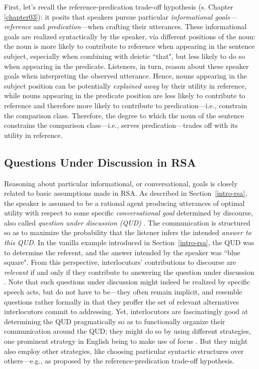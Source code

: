 First, let's recall the reference-predication trade-off hypothesis (s. Chapter \ref{chapter03}): it posits that speakers pursue particular \emph{informational goals---reference} and \emph{predication}---when crafting their utterances. These informational goals are realized syntactically by the speaker, via different positions of the noun: the noun is more likely to contribute to reference when appearing in the sentence subject, especially when combining with deictic ``that", but less likely to do so when appearing in the predicate. Listeners, in turn, reason about these speaker goals when interpreting the observed utterance.  Hence, nouns appearing in the subject position can be potentially \emph{explained away} by their utility in reference, while nouns appearing in the predicate position are less likely to contribute to reference and therefore more likely to contribute to predication---i.e., constrain the comparison class. 
Therefore, the degree to which the noun of the sentence constrains the comparison class---i.e., serves predication---trades off with its utility in reference. 

\subsection{Questions Under Discussion in RSA}
\label{rsa-qud}
Reasoning about particular informational, or conversational, goals is closely related to basic assumptions made in RSA.
As described in Section~\ref{intro-rsa}, the speaker is assumed to be a rational agent producing utterances of optimal utility with respect to some specific \emph{conversational goal} determined by discourse, also called \emph{question under discussion (QUD)}  \parencite{lassiter2017adjectival, roberts2012information}. The communication is structured so as to maximize the probability that the listener infers the intended \emph{answer to this QUD}. In the vanilla example introduced in Section~\ref{intro-rsa}, the QUD was to determine the referent, and the answer intended by the speaker was ``blue square". From this perspective, interlocutors' contributions to discourse are \emph{relevant} if and only if they contribute to answering the question under discussion \parencite{roberts2012information}. Note that such questions under discussion might indeed be realized by specific speech acts, but do not have to be---they often remain implicit, and resemble questions rather formally in that they proffer the set of relevant alternatives interlocutors commit to addressing. Yet, interlocutors are fascinatingly good at determining the QUD pragmatically so as to functionally organize their communication around the QUD; they might do so by using different strategies, one prominent strategy in English being to make use of focus \parencite{roberts2012information, krifka2008basic}. But they might also employ other strategies, like choosing particular syntactic structures over others---e.g., as proposed by the reference-predication trade-off hypothesis.  

